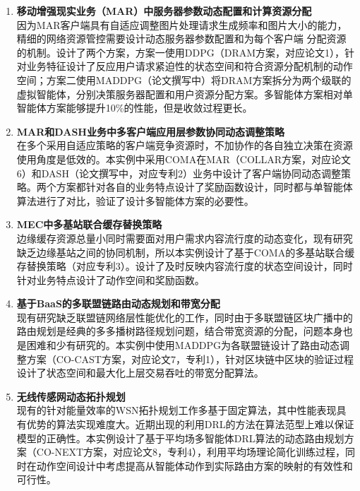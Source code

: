 \documentclass{resume}
\begin{document}
\begin{enumerate}
  \item \textbf{移动增强现实业务（MAR）中服务器参数动态配置和计算资源分配}
  \\ 因为MAR客户端具有自适应调整图片处理请求生成频率和图片大小的能力，精细的网络资源管控需要设计动态服务器参数配置和为每个客户端 分配资源的机制。设计了两个方案，方案一使用DDPG（DRAM方案，对应论文1），针对业务特征设计了反应用户请求紧迫性的状态空间和符合资源分配机制的动作空间；方案二使用MADDPG（论文撰写中）将DRAM方案拆分为两个级联的虚拟智能体，分别决策服务器配置和用户资源分配方案。多智能体方案相对单智能体方案能够提升10\%的性能，但是收敛过程更长。
  \item \textbf{MAR和DASH业务中多客户端应用层参数协同动态调整策略} 
  \\ 在多个采用自适应策略的客户端竞争资源时，不加协作的各自独立决策在资源使用角度是低效的。本实例中采用COMA在MAR（COLLAR方案，对应论文6）和DASH（论文撰写中，对应专利2）业务中设计了客户端协同动态调整策略。两个方案都针对各自的业务特点设计了奖励函数设计，同时都与单智能体算法进行了对比，验证了设计多智能体方案的必要性。
  \item \textbf{MEC中多基站联合缓存替换策略} 
  \\ 边缘缓存资源总量小同时需要面对用户需求内容流行度的动态变化，现有研究缺乏边缘基站之间的协同机制，所以本实例设计了基于COMA的多基站联合缓存替换策略（对应专利3）。设计了及时反映内容流行度的状态空间设计，同时针对业务特点设计了动作空间和奖励函数。
  \item  \textbf{基于BaaS的多联盟链路由动态规划和带宽分配}
  \\ 现有研究缺乏联盟链网络层性能优化的工作，同时由于多联盟链区块广播中的路由规划是经典的多多播树路径规划问题，结合带宽资源的分配，问题本身也是困难和少有研究的。本实例中使用MADDPG为各联盟链设计了路由动态调整方案（CO-CAST方案，对应论文7，专利1），针对区块链中区块的验证过程设计了状态空间和最大化上层交易吞吐的带宽分配算法。
  \item \textbf{无线传感网动态拓扑规划}
  \\ 现有的针对能量效率的WSN拓扑规划工作多基于固定算法，其中性能表现具有优势的算法实现难度大。近期出现的利用DRL的方法在算法范型上难以保证模型的正确性。本实例设计了基于平均场多智能体DRL算法的动态路由规划方案（CO-NEXT方案，对应论文8，专利4），利用平均场理论简化训练过程，同时在动作空间设计中考虑提高从智能体动作到实际路由方案的映射的有效性和可行性。
\end{enumerate}
\end{document}
